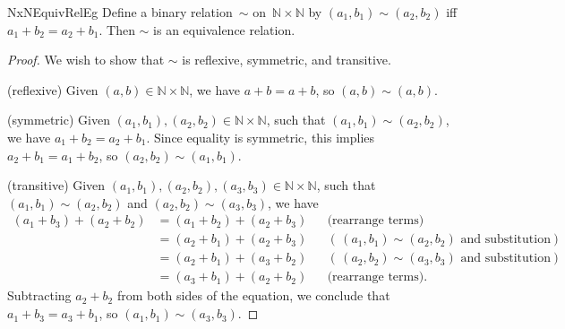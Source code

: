 \begin{example}{NxNEquivRelEg}
Define a binary relation~$\sim$ on~$\mathbb{N} \times \mathbb{N}$ by $(a_1,b_1) \sim (a_2,b_2)$ iff $a_1 + b_2 = a_2 + b_1$. Then $\sim$ is an equivalence relation.

\begin{proof}
We wish to show that $\sim$ is reflexive, symmetric, and transitive.

\noindent
(reflexive) Given $(a,b) \in \mathbb{N} \times \mathbb{N}$, we have $a + b = a + b$, so $(a,b) \sim (a,b)$.

\noindent
(symmetric) Given $(a_1,b_1) , (a_2,b_2) \in \mathbb{N} \times \mathbb{N}$, such that $(a_1,b_1) \sim (a_2,b_2)$, we have $a_1 +b_2 = a_2 + b_1$. Since equality is symmetric, this implies $a_2 + b_1 = a_1 + b_2$, so $(a_2,b_2) \sim (a_1,b_1)$.

\noindent
(transitive) Given $(a_1,b_1) , (a_2,b_2) , (a_3,b_3) \in \mathbb{N} \times \mathbb{N}$, such that $(a_1,b_1) \sim (a_2,b_2)$ and $(a_2,b_2) \sim (a_3,b_3)$, we have 
	\begin{align*}
	(a_1 + b_3) + (a_2 + b_2)
		&= (a_1 + b_2) + (a_2 + b_3) && \text{(rearrange terms)}
		\\&= (a_2 + b_1) + (a_2 + b_3) && (\,(a_1,b_1) \sim (a_2,b_2)\text{ and substitution})
		\\&= (a_2 + b_1) + (a_3 + b_2) && (\,(a_2,b_2) \sim (a_3,b_3)\text{ and substitution})
		\\&= (a_3 + b_1) + (a_2 + b_2) && \text{(rearrange terms)} .
	\end{align*}
Subtracting $a_2 + b_2$ from both sides of the equation, we conclude that $a_1 + b_3 = a_3 + b_1$,
so $(a_1,b_1) \sim (a_3,b_3)$.
\end{proof}
\end{example}


